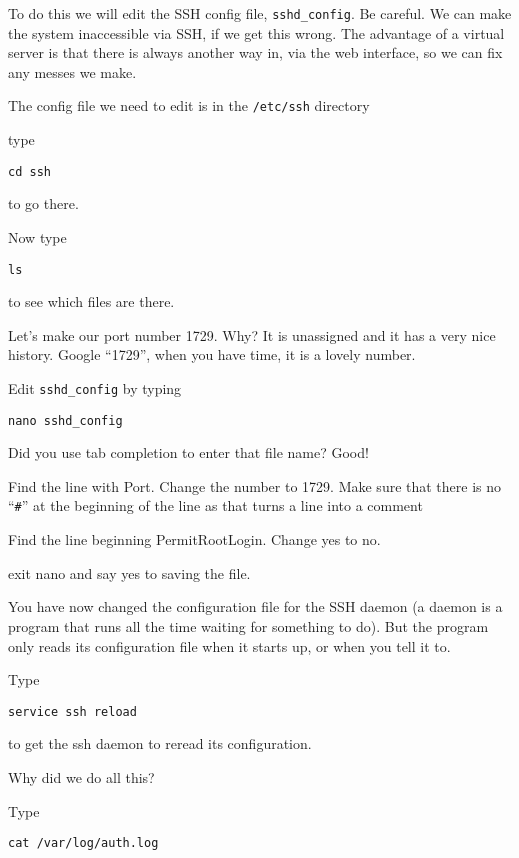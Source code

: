 \documentclass[12pt,a4paper]{article}
\begin{document}
To do this we will edit the SSH config file, \verb|sshd_config|. Be careful. We can make the system inaccessible via SSH, if we get this wrong. The advantage of a virtual server is that there is always another way in, via the web interface, so we can fix any messes we make.

The config file we need to edit is in the \verb|/etc/ssh| directory

type
\begin{lstlisting}
cd ssh
\end{lstlisting}

to go there.

Now type

\begin{lstlisting}
ls
\end{lstlisting}
 
to see which files are there.

Let’s make our port number 1729. Why? It is unassigned and it has a very nice history. Google “1729”, when you have time, it is a lovely number.

Edit \verb|sshd_config| by typing

\begin{lstlisting}
nano sshd_config
\end{lstlisting}

Did you use tab completion to enter that file name? Good!

Find the line with Port. Change the number to 1729. Make sure that there is no ``\verb|#|'' at the beginning of the line as that turns a line into a comment 

Find the line beginning PermitRootLogin. Change yes to no.

exit nano and say yes to saving the file.

You have now changed the configuration file for the SSH daemon (a daemon is a program that runs all the time waiting for something to do). But the program only reads its configuration file when it starts up, or when you tell it to.

Type
\begin{lstlisting}
service ssh reload
\end{lstlisting}
to get the ssh daemon to reread its configuration.

Why did we do all this?

Type 
\begin{lstlisting}
cat /var/log/auth.log
\end{lstlisting}
\end{document}
